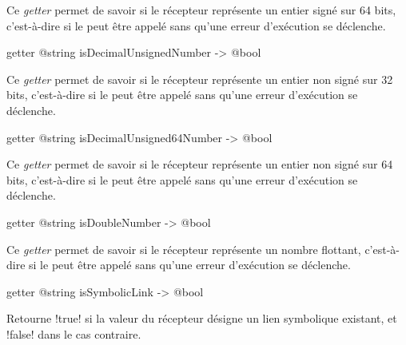 Ce \emph{getter} permet de savoir si le récepteur représente un entier signé sur 64 bits, c'est-à-dire si le  peut être appelé sans qu'une erreur d'exécution se déclenche.







\begin{galgas4box}
getter @string isDecimalUnsignedNumber -> @bool
\end{galgas4box}

Ce \emph{getter} permet de savoir si le récepteur représente un entier non signé sur 32 bits, c'est-à-dire si le  peut être appelé sans qu'une erreur d'exécution se déclenche.







\begin{galgas4box}
getter @string isDecimalUnsigned64Number -> @bool
\end{galgas4box}

Ce \emph{getter} permet de savoir si le récepteur représente un entier non signé sur 64 bits, c'est-à-dire si le  peut être appelé sans qu'une erreur d'exécution se déclenche.







\begin{galgas4box}
getter @string isDoubleNumber -> @bool
\end{galgas4box}

Ce \emph{getter} permet de savoir si le récepteur représente un nombre flottant, c'est-à-dire si le  peut être appelé sans qu'une erreur d'exécution se déclenche.








\begin{galgas4box}
getter @string isSymbolicLink -> @bool
\end{galgas4box}

Retourne \ggsq!true! si la valeur du récepteur désigne un lien symbolique existant, et \ggsq!false! dans le cas contraire.








